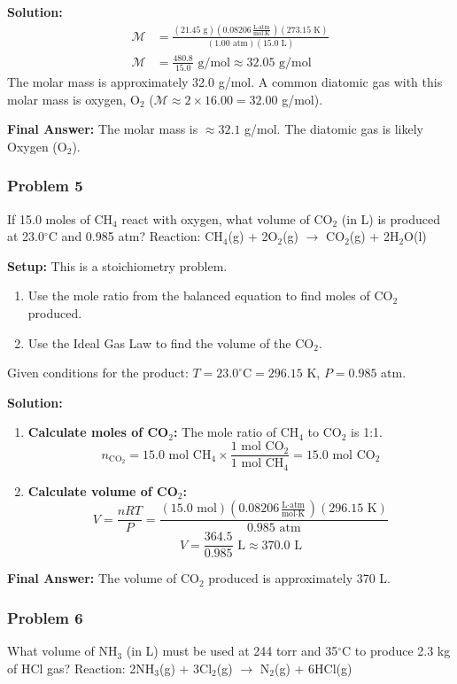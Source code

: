 \documentclass{article}
\begin{document}
\textbf{Solution:}
\begin{align*}
    \mathcal{M} &= \frac{(21.45 \text{ g})(0.08206 \frac{\text{L} \cdot \text{atm}}{\text{mol} \cdot \text{K}})(273.15 \text{ K})}{(1.00 \text{ atm})(15.0 \text{ L})} \\
    \mathcal{M} &= \frac{480.8}{15.0} \text{ g/mol} \approx 32.05 \text{ g/mol}
\end{align*}
The molar mass is approximately 32.0 g/mol. A common diatomic gas with this molar mass is oxygen, O$_2$ ($\mathcal{M} \approx 2 \times 16.00 = 32.00$ g/mol).

\textbf{Final Answer:} The molar mass is $\approx 32.1$ g/mol. The diatomic gas is likely Oxygen (O$_2$).

\subsubsection{Problem 5}
If 15.0 moles of CH$_4$ react with oxygen, what volume of CO$_2$ (in L) is produced at 23.0$^{\circ}$C and 0.985 atm?
Reaction: CH$_4$(g) + 2O$_2$(g) $\rightarrow$ CO$_2$(g) + 2H$_2$O(l)

\textbf{Setup:}
This is a stoichiometry problem.
\begin{enumerate}
    \item Use the mole ratio from the balanced equation to find moles of CO$_2$ produced.
    \item Use the Ideal Gas Law to find the volume of the CO$_2$.
\end{enumerate}
Given conditions for the product: $T = 23.0^{\circ}\text{C} = 296.15$ K, $P = 0.985$ atm.

\textbf{Solution:}
\begin{enumerate}
    \item \textbf{Calculate moles of CO$_2$:} The mole ratio of CH$_4$ to CO$_2$ is 1:1.
    \[ n_{\text{CO}_2} = 15.0 \text{ mol CH}_4 \times \frac{1 \text{ mol CO}_2}{1 \text{ mol CH}_4} = 15.0 \text{ mol CO}_2 \]
    \item \textbf{Calculate volume of CO$_2$:}
    \[ V = \frac{nRT}{P} = \frac{(15.0 \text{ mol})(0.08206 \frac{\text{L} \cdot \text{atm}}{\text{mol} \cdot \text{K}})(296.15 \text{ K})}{0.985 \text{ atm}} \]
    \[ V = \frac{364.5}{0.985} \text{ L} \approx 370.0 \text{ L} \]
\end{enumerate}

\textbf{Final Answer:} The volume of CO$_2$ produced is approximately 370 L.

\subsubsection{Problem 6}
What volume of NH$_3$ (in L) must be used at 244 torr and 35$^{\circ}$C to produce 2.3 kg of HCl gas?
Reaction: 2NH$_3$(g) + 3Cl$_2$(g) $\rightarrow$ N$_2$(g) + 6HCl(g)
\end{document}
